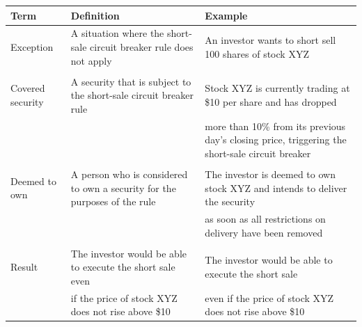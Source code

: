 \documentclass[11pt]{article}
\begin{document}
\begin{enumerate}
\begin{center}
\begin{tabular}{lll}
\hline
Term & Definition & Example\\[0pt]
\hline
Exception & A situation where the short-sale circuit breaker rule does not apply & An investor wants to short sell 100 shares of stock XYZ\\[0pt]
 &  & \\[0pt]
Covered security & A security that is subject to the short-sale circuit breaker rule & Stock XYZ is currently trading at \$10 per share and has dropped\\[0pt]
 &  & more than 10\% from its previous day's closing price, triggering the short-sale circuit breaker\\[0pt]
 &  & \\[0pt]
Deemed to own & A person who is considered to own a security for the purposes of the rule & The investor is deemed to own stock XYZ and intends to deliver the security\\[0pt]
 &  & as soon as all restrictions on delivery have been removed\\[0pt]
 &  & \\[0pt]
Result & The investor would be able to execute the short sale even & The investor would be able to execute the short sale\\[0pt]
 & if the price of stock XYZ does not rise above \$10 & even if the price of stock XYZ does not rise above \$10\\[0pt]
\hline
\end{tabular}
\end{center}



\end{enumerate}
\end{document}
